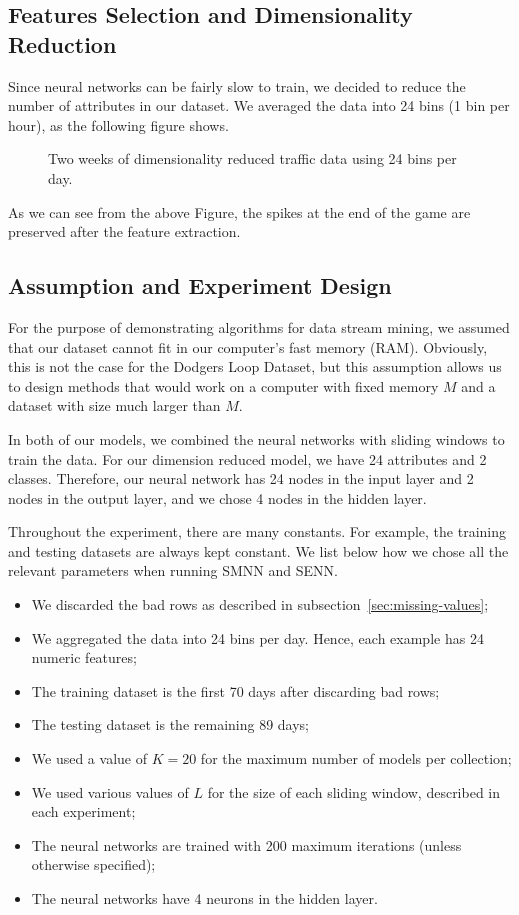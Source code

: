 \documentclass[conference]{IEEEtran}
\begin{document}
\subsection{Features Selection and Dimensionality Reduction}
Since neural networks can be fairly slow to train, we decided to reduce the number of attributes in our dataset. We averaged the data into 24 bins (1 bin per hour), as the following figure shows.

\begin{figure}[H]
	\caption{Two weeks of dimensionality reduced traffic data using 24 bins per day.}
	\label{fig:two-weeks-reduced-dimensionality}
\end{figure}
As we can see from the above Figure, the spikes at the end of the game are preserved after the feature extraction.

\subsection{Assumption and Experiment Design}
For the purpose of demonstrating algorithms for data stream mining, we assumed that our dataset cannot fit in our computer's fast memory (RAM). Obviously, this is not the case for the Dodgers Loop Dataset, but this assumption allows us to design methods that would work on a computer with fixed memory $M$ and a dataset with size much larger than $M$.

In both of our models, we combined the neural networks with sliding windows to train the data. For our dimension reduced model, we have 24 attributes and 2 classes. Therefore, our neural network has 24 nodes in the input layer and 2 nodes in the output layer, and we chose 4 nodes in the hidden layer. 

Throughout the experiment, there are many constants. For example, the training and testing datasets are always kept constant. We list below how we chose all the relevant parameters when running SMNN and SENN. 
\begin{itemize}
	\item We discarded the bad rows as described in subsection~\ref{sec:missing-values};
	\item We aggregated the data into 24 bins per day. Hence, each example has 24 numeric features;
	\item The training dataset is the first 70 days after discarding bad rows;
	\item The testing dataset is the remaining 89 days;
	\item We used a value of $K=20$ for the maximum number of models per collection;
	\item We used various values of $L$ for the size of each sliding window, described in each experiment;
	\item The neural networks are trained with 200 maximum iterations (unless otherwise specified);
	\item The neural networks have 4 neurons in the hidden layer.
\end{itemize}
\end{document}
